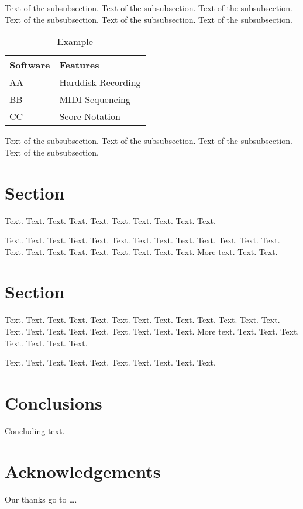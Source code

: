 \documentclass[11pt,a4paper]{article}
\begin{document}
Text of the subsubsection.
Text of the subsubsection.
Text of the subsubsection.
Text of the subsubsection.
Text of the subsubsection.
Text of the subsubsection.


\begin{table}[h]
 \begin{center}
\begin{tabular}{|l|l|}

      \hline
      Software & Features\\
      \hline\hline
      AA & Harddisk-Recording\\
      BB & MIDI Sequencing\\
      CC & Score Notation\\
      \hline

\end{tabular}
\caption{Example}\label{table1}
 \end{center}
\end{table}


Text of the subsubsection.
Text of the subsubsection.
Text of the subsubsection.
Text of the subsubsection.


\section{Section}

Text. Text. Text. Text. Text.
Text. Text. Text. Text. Text.

Text. Text. Text. Text. Text.
Text. Text. Text. Text. Text.
Text. Text. Text. Text. Text.
Text. Text. Text. Text. Text.
Text. Text. More text. Text. Text.

\section{Section}

Text. Text. Text. Text. Text.
Text. Text. Text. Text. Text.
Text. Text. Text. Text. Text.
Text. Text. Text. Text. Text.
Text. Text. More text. Text. Text.
Text. Text. Text. Text. Text.

Text. Text. Text. Text. Text.
Text. Text. Text. Text. Text.

\section{Conclusions}

Concluding text.

\section{Acknowledgements}

Our thanks go to \ldots .
\end{document}
